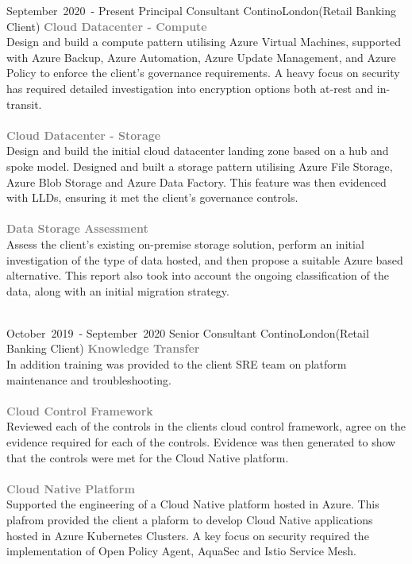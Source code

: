 
\edef\hc{\string:}

\cventry %
  {\mbox{September 2020 -} \mbox{Present}}
  {Principal Consultant}
  {Contino}{London}{(Retail Banking Client)}
  { 
    \textcolor{gray}{\textbf{Cloud Datacenter - Compute}}\\ 
    Design and build a compute pattern utilising Azure Virtual Machines, 
    supported with Azure Backup, Azure Automation, Azure Update Management,
    and Azure Policy to enforce the client's governance requirements.
    A heavy focus on security has required detailed investigation into 
    encryption options both at-rest and in-transit.\\\\
    \textcolor{gray}{\textbf{Cloud Datacenter - Storage}}\\ 
    Design and build the initial cloud datacenter landing zone based on
    a hub and spoke model. Designed and built a storage pattern utilising
    Azure File Storage, Azure Blob Storage and Azure Data Factory. This 
    feature was then evidenced with LLDs, ensuring it met the client's 
    governance controls.\\\\
    \textcolor{gray}{\textbf{Data Storage Assessment}}\\ 
    Assess the client's existing on-premise storage solution, perform
    an initial investigation of the type of data hosted, and then
    propose a suitable Azure based alternative. This report also took
    into account the ongoing classification of the data, along with 
    an initial migration strategy.\\\\
  }

\cventry %
  {\mbox{October 2019 -} \mbox{September 2020}}
  {Senior Consultant}
  {Contino}{London}{(Retail Banking Client)}
  {
    \textcolor{gray}{\textbf{Knowledge Transfer}}\\
    In addition training was provided
    to the client SRE team on platform maintenance and troubleshooting.\\\\
    \textcolor{gray}{\textbf{Cloud Control Framework}}\\
    Reviewed each of the controls in the clients cloud control framework, 
    agree on the evidence required for each of the controls. 
    Evidence was then generated to show that the controls were met for the 
    Cloud Native platform.\\\\
    \textcolor{gray}{\textbf{Cloud Native Platform}}\\
    Supported the engineering of a Cloud Native platform hosted in Azure. 
    This plafrom provided the client a plaform to develop Cloud Native applications
    hosted in Azure Kubernetes Clusters. A key focus on security required the implementation
    of Open Policy Agent, AquaSec and Istio Service Mesh.\\
  }

